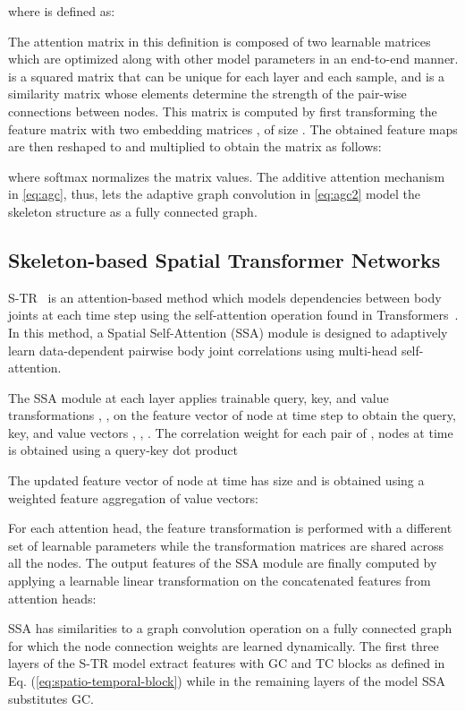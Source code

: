 \documentclass[journal]{IEEEtran}
\theoremstyle{definition}
\begin{document}
where  is defined as:


The attention matrix in this definition is composed of two learnable matrices which are optimized along with other model parameters in an end-to-end manner.  is a squared matrix that can be unique for each layer and each sample, and  is a similarity matrix whose elements determine the strength of the pair-wise connections between nodes. 
This matrix is computed by first transforming the feature matrix  with two embedding matrices ,  of size . The obtained feature maps are then reshaped to  and multiplied to obtain the  matrix as follows:

where softmax normalizes the matrix values. 
The additive attention mechanism in \cref{eq:agc}, thus, lets the adaptive graph convolution in \cref{eq:agc2} model the skeleton structure as a fully connected graph.

\subsection{Skeleton-based Spatial Transformer Networks}
S-TR~\cite{plizzari2021skeleton} is an attention-based method which 
models dependencies between body joints at each time step using the self-attention operation found in Transformers~\cite{vaswani2017attention}. 
In this method, a Spatial Self-Attention (SSA) module is designed to adaptively learn data-dependent pairwise body joint correlations using multi-head self-attention. 

The SSA module at each layer  applies trainable query, key, and value transformations , ,  on the feature vector  of node  at time step  to obtain the query, key, and value vectors , , . 
The correlation weight for each pair of ,  nodes at time  is obtained using a query-key dot product 

The updated feature vector of node  at time  has size  and is obtained using a weighted feature aggregation of value vectors:


For each attention head, the feature transformation is performed with a different set of learnable parameters while the transformation matrices are shared across all the nodes.
The output features of the SSA module are finally computed by applying a learnable linear transformation on the concatenated features from  attention heads:


SSA has similarities to a graph convolution operation on a fully connected graph for which the node connection weights are learned dynamically. 
The first three layers of the S-TR model extract features with GC and TC blocks as defined in Eq. (\ref{eq:spatio-temporal-block}) while in the remaining layers of the model SSA substitutes GC.
\end{document}
